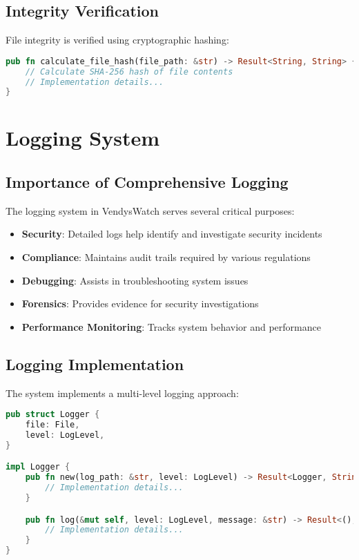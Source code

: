 \documentclass[12pt]{article}
\begin{document}
\subsection{Integrity Verification}
File integrity is verified using cryptographic hashing:
\begin{lstlisting}[language=Rust]
pub fn calculate_file_hash(file_path: &str) -> Result<String, String> {
    // Calculate SHA-256 hash of file contents
    // Implementation details...
}
\end{lstlisting}

\section{Logging System}
\subsection{Importance of Comprehensive Logging}
The logging system in VendysWatch serves several critical purposes:

\begin{itemize}
    \item \textbf{Security}: Detailed logs help identify and investigate security incidents
    \item \textbf{Compliance}: Maintains audit trails required by various regulations
    \item \textbf{Debugging}: Assists in troubleshooting system issues
    \item \textbf{Forensics}: Provides evidence for security investigations
    \item \textbf{Performance Monitoring}: Tracks system behavior and performance
\end{itemize}

\subsection{Logging Implementation}
The system implements a multi-level logging approach:

\begin{lstlisting}[language=Rust]
pub struct Logger {
    file: File,
    level: LogLevel,
}

impl Logger {
    pub fn new(log_path: &str, level: LogLevel) -> Result<Logger, String> {
        // Implementation details...
    }

    pub fn log(&mut self, level: LogLevel, message: &str) -> Result<(), String> {
        // Implementation details...
    }
}
\end{lstlisting}
\end{document}
